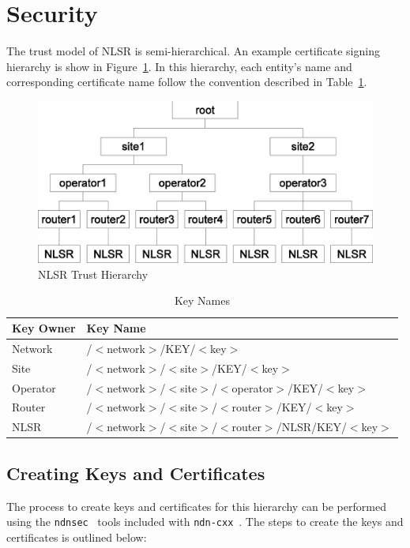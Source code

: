 \section{Security}
\label{sec:security}

The trust model of NLSR is semi-hierarchical. An example certificate signing hierarchy is show in Figure~\ref{fig:trust}.
In this hierarchy, each entity's name and corresponding certificate name follow the convention described in Table~\ref{table:kname}.

\begin{figure}
\centering
\includegraphics[width=0.5\linewidth]{figures/trust-hierarchy.eps}
\caption{NLSR Trust Hierarchy}
\label{fig:trust}
\end{figure}

\begin{table}
\centering	
	\caption{Key Names}
	\small
	\begin{tabular}{|l|l|}
	\hline
	\bfseries {Key Owner} & \bfseries {Key Name}\\ \hline
	Network & /$<$network$>$/KEY/$<$key$>$\\ \hline
	Site & /$<$network$>$/$<$site$>$/KEY/$<$key$>$\\ \hline
	Operator & /$<$network$>$/$<$site$>$/$<$operator$>$/KEY/$<$key$>$\\\hline
	Router & /$<$network$>$/$<$site$>$/$<$router$>$/KEY/$<$key$>$\\\hline
	NLSR & /$<$network$>$/$<$site$>$/$<$router$>$/NLSR/KEY/$<$key$>$\\\hline
	\end{tabular}
	\label{table:kname}
	\vspace{-3mm}
\end{table}

\subsection{Creating Keys and Certificates}

The process to create keys and certificates for this hierarchy can be performed using the \texttt{ndnsec}~\cite{ndnsec} tools included with \texttt{ndn-cxx}~\cite{NDNCXX}.
The steps to create the keys and certificates is outlined below:

